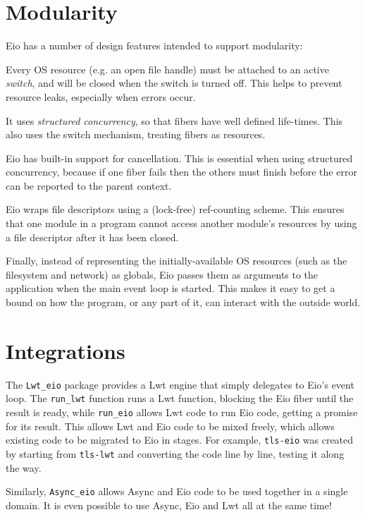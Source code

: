 \documentclass[a4paper,twocolumn]{article}
\begin{document}
\section*{Modularity}

Eio has a number of design features intended to support modularity:

Every OS resource (e.g. an open file handle) must be attached to an active \emph{switch},
and will be closed when the switch is turned off.
This helps to prevent resource leaks, especially when errors occur.

It uses \emph{structured concurrency}, so that fibers have well defined life-times.
This also uses the switch mechanism, treating fibers as resources.

Eio has built-in support for cancellation. This is essential when using structured concurrency,
because if one fiber fails then the others must finish before the error can be reported to the parent context.

Eio wraps file descriptors using a (lock-free) ref-counting scheme.
This ensures that one module in a program cannot access another module's resources
by using a file descriptor after it has been closed.

Finally, instead of representing the initially-available OS resources (such as the filesystem and network) as globals,
Eio passes them as arguments to the application when the main event loop is started.
This makes it easy to get a bound on how the program, or any part of it, can interact with the outside world.

\section*{Integrations}

The \verb|Lwt_eio| package provides a Lwt engine that simply delegates to Eio's event loop.
The \verb|run_lwt| function runs a Lwt function, blocking the Eio fiber until the result is ready,
while \verb|run_eio| allows Lwt code to run Eio code, getting a promise for its result.
This allows Lwt and Eio code to be mixed freely, which allows existing code to be migrated to Eio in stages.
For example, \verb|tls-eio| was created by starting from \verb|tls-lwt| and converting the code line by line,
testing it along the way.

Similarly, \verb|Async_eio| allows Async and Eio code to be used together in a single domain.
It is even possible to use Async, Eio and Lwt all at the same time!
\end{document}
